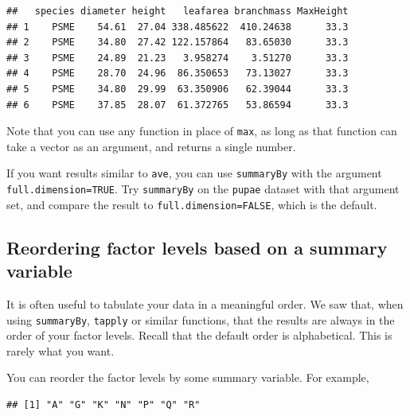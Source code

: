 \documentclass[]{book}
\newenvironment{Shaded}{\begin{snugshade}}{\end{snugshade}}
\newcommand{\CommentTok}[1]{\textcolor[rgb]{0.56,0.35,0.01}{\textit{#1}}}
\newcommand{\KeywordTok}[1]{\textcolor[rgb]{0.13,0.29,0.53}{\textbf{#1}}}
\newcommand{\NormalTok}[1]{#1}
\newcommand{\OperatorTok}[1]{\textcolor[rgb]{0.81,0.36,0.00}{\textbf{#1}}}
\let\BeginKnitrBlock\begin \let\EndKnitrBlock\end
\begin{document}
\begin{verbatim}
##   species diameter height   leafarea branchmass MaxHeight
## 1    PSME    54.61  27.04 338.485622  410.24638      33.3
## 2    PSME    34.80  27.42 122.157864   83.65030      33.3
## 3    PSME    24.89  21.23   3.958274    3.51270      33.3
## 4    PSME    28.70  24.96  86.350653   73.13027      33.3
## 5    PSME    34.80  29.99  63.350906   62.39044      33.3
## 6    PSME    37.85  28.07  61.372765   53.86594      33.3
\end{verbatim}

Note that you can use any function in place of \texttt{max}, as long as that function can take a vector as an argument, and returns a single number.

\BeginKnitrBlock{rmdtry}
If you want results similar to \texttt{ave}, you can use \texttt{summaryBy} with the argument \texttt{full.dimension=TRUE}. Try \texttt{summaryBy} on the \texttt{pupae} dataset with that argument set, and compare the result to \texttt{full.dimension=FALSE}, which is the default.
\EndKnitrBlock{rmdtry}

\hypertarget{reorder}{%
\subsection{Reordering factor levels based on a summary variable}\label{reorder}}

It is often useful to tabulate your data in a meaningful order. We saw that, when using \texttt{summaryBy}, \texttt{tapply} or similar functions, that the results are always in the order of your factor levels. Recall that the default order is alphabetical. This is rarely what you want.

You can reorder the factor levels by some summary variable. For example,

\begin{Shaded}
\end{Shaded}

\begin{verbatim}
## [1] "A" "G" "K" "N" "P" "Q" "R"
\end{verbatim}
\end{document}
